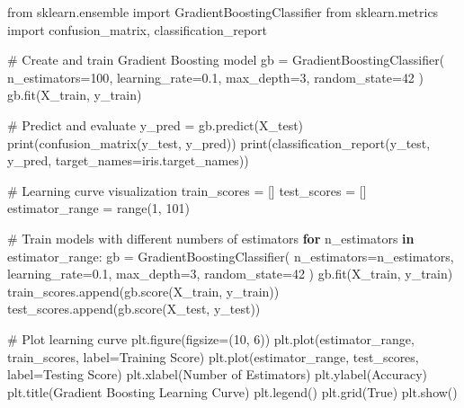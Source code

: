 \documentclass[
  letterpaper,
  DIV=11,
  numbers=noendperiod]{scrreprt}
\newenvironment{Shaded}{\begin{snugshade}}{\end{snugshade}}
\newcommand{\BuiltInTok}[1]{\textcolor[rgb]{0.00,0.23,0.31}{#1}}
\newcommand{\CommentTok}[1]{\textcolor[rgb]{0.37,0.37,0.37}{#1}}
\newcommand{\ControlFlowTok}[1]{\textcolor[rgb]{0.00,0.23,0.31}{\textbf{#1}}}
\newcommand{\DecValTok}[1]{\textcolor[rgb]{0.68,0.00,0.00}{#1}}
\newcommand{\FloatTok}[1]{\textcolor[rgb]{0.68,0.00,0.00}{#1}}
\newcommand{\ImportTok}[1]{\textcolor[rgb]{0.00,0.46,0.62}{#1}}
\newcommand{\KeywordTok}[1]{\textcolor[rgb]{0.00,0.23,0.31}{\textbf{#1}}}
\newcommand{\NormalTok}[1]{\textcolor[rgb]{0.00,0.23,0.31}{#1}}
\newcommand{\OperatorTok}[1]{\textcolor[rgb]{0.37,0.37,0.37}{#1}}
\newcommand{\StringTok}[1]{\textcolor[rgb]{0.13,0.47,0.30}{#1}}
\newcommand{\VariableTok}[1]{\textcolor[rgb]{0.07,0.07,0.07}{#1}}
\begin{document}
\begin{Shaded}
\begin{Highlighting}[]
\ImportTok{from}\NormalTok{ sklearn.ensemble }\ImportTok{import}\NormalTok{ GradientBoostingClassifier}
\ImportTok{from}\NormalTok{ sklearn.metrics }\ImportTok{import}\NormalTok{ confusion\_matrix, classification\_report}

\CommentTok{\# Create and train Gradient Boosting model}
\NormalTok{gb }\OperatorTok{=}\NormalTok{ GradientBoostingClassifier(}
\NormalTok{    n\_estimators}\OperatorTok{=}\DecValTok{100}\NormalTok{,}
\NormalTok{    learning\_rate}\OperatorTok{=}\FloatTok{0.1}\NormalTok{,}
\NormalTok{    max\_depth}\OperatorTok{=}\DecValTok{3}\NormalTok{,}
\NormalTok{    random\_state}\OperatorTok{=}\DecValTok{42}
\NormalTok{)}
\NormalTok{gb.fit(X\_train, y\_train)}

\CommentTok{\# Predict and evaluate}
\NormalTok{y\_pred }\OperatorTok{=}\NormalTok{ gb.predict(X\_test)}
\BuiltInTok{print}\NormalTok{(confusion\_matrix(y\_test, y\_pred))}
\BuiltInTok{print}\NormalTok{(classification\_report(y\_test, y\_pred, target\_names}\OperatorTok{=}\NormalTok{iris.target\_names))}

\CommentTok{\# Learning curve visualization}
\NormalTok{train\_scores }\OperatorTok{=}\NormalTok{ []}
\NormalTok{test\_scores }\OperatorTok{=}\NormalTok{ []}
\NormalTok{estimator\_range }\OperatorTok{=} \BuiltInTok{range}\NormalTok{(}\DecValTok{1}\NormalTok{, }\DecValTok{101}\NormalTok{)}

\CommentTok{\# Train models with different numbers of estimators}
\ControlFlowTok{for}\NormalTok{ n\_estimators }\KeywordTok{in}\NormalTok{ estimator\_range:}
\NormalTok{    gb }\OperatorTok{=}\NormalTok{ GradientBoostingClassifier(}
\NormalTok{        n\_estimators}\OperatorTok{=}\NormalTok{n\_estimators,}
\NormalTok{        learning\_rate}\OperatorTok{=}\FloatTok{0.1}\NormalTok{,}
\NormalTok{        max\_depth}\OperatorTok{=}\DecValTok{3}\NormalTok{,}
\NormalTok{        random\_state}\OperatorTok{=}\DecValTok{42}
\NormalTok{    )}
\NormalTok{    gb.fit(X\_train, y\_train)}
\NormalTok{    train\_scores.append(gb.score(X\_train, y\_train))}
\NormalTok{    test\_scores.append(gb.score(X\_test, y\_test))}

\CommentTok{\# Plot learning curve}
\NormalTok{plt.figure(figsize}\OperatorTok{=}\NormalTok{(}\DecValTok{10}\NormalTok{, }\DecValTok{6}\NormalTok{))}
\NormalTok{plt.plot(estimator\_range, train\_scores, label}\OperatorTok{=}\StringTok{\textquotesingle{}Training Score\textquotesingle{}}\NormalTok{)}
\NormalTok{plt.plot(estimator\_range, test\_scores, label}\OperatorTok{=}\StringTok{\textquotesingle{}Testing Score\textquotesingle{}}\NormalTok{)}
\NormalTok{plt.xlabel(}\StringTok{\textquotesingle{}Number of Estimators\textquotesingle{}}\NormalTok{)}
\NormalTok{plt.ylabel(}\StringTok{\textquotesingle{}Accuracy\textquotesingle{}}\NormalTok{)}
\NormalTok{plt.title(}\StringTok{\textquotesingle{}Gradient Boosting Learning Curve\textquotesingle{}}\NormalTok{)}
\NormalTok{plt.legend()}
\NormalTok{plt.grid(}\VariableTok{True}\NormalTok{)}
\NormalTok{plt.show()}
\end{Highlighting}
\end{Shaded}
\end{document}
